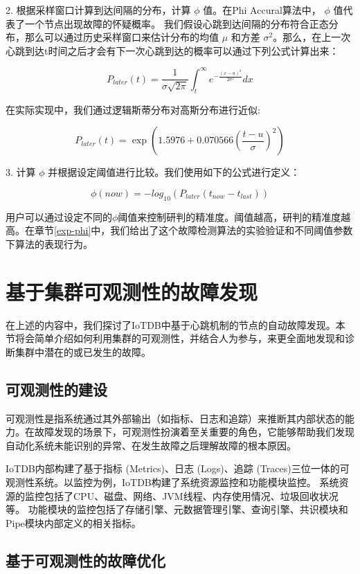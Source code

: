 2. 根据采样窗口计算到达间隔的分布，计算 $\phi$ 值。在Phi Accural算法中， $\phi$ 值代表了一个节点出现故障的怀疑概率。
我们假设心跳到达间隔的分布符合正态分布，那么可以通过历史采样窗口来估计分布的均值 $\mu$ 和方差 $\sigma^2$。那么，在上一次心跳到达t时间之后才会有下一次心跳到达的概率可以通过下列公式计算出来：


$$ P_{later}(t) = \frac{1}{\sigma\sqrt{2\pi}} \int_{t}^{\infty} e^{-\frac{(x-u)^2}{2\sigma^2}} dx $$

在实际实现中，我们通过逻辑斯蒂分布对高斯分布进行近似\cite{bronvstejn2013handbook}:

$$ P_{later}(t) = \exp(1.5976 + 0.070566 (\frac{t-u}{\sigma})^2) $$


3. 计算 $\phi$ 并根据设定阈值进行比较。我们使用如下的公式进行定义：

$$ \phi(now) = -log_{10}(P_{later}(t_{now} - t_{last})) $$

用户可以通过设定不同的$\phi$阈值来控制研判的精准度。阈值越高，研判的精准度越高。在章节\ref{exp-phi}中，我们给出了这个故障检测算法的实验验证和不同阈值参数下算法的表现行为。


\section{基于集群可观测性的故障发现}

在上述的内容中，我们探讨了IoTDB中基于心跳机制的节点的自动故障发现。本节将会简单介绍如何利用集群的可观测性，并结合人为参与，来更全面地发现和诊断集群中潜在的或已发生的故障。

\subsection{可观测性的建设}

可观测性是指系统通过其外部输出（如指标、日志和追踪）来推断其内部状态的能力。在故障发现的场景下，可观测性扮演着至关重要的角色，它能够帮助我们发现自动化系统未能识别的异常、在发生故障之后理解故障的根本原因。

IoTDB内部构建了基于指标 (Metrics)、日志 (Logs)、追踪 (Traces)三位一体的可观测性系统。以监控为例，IoTDB构建了系统资源监控和功能模块监控。
系统资源的监控包括了CPU、磁盘、网络、JVM线程、内存使用情况、垃圾回收状况等。
功能模块的监控包括了存储引擎、元数据管理引擎、查询引擎、共识模块和Pipe模块内部定义的相关指标。

\subsection{基于可观测性的故障优化}

